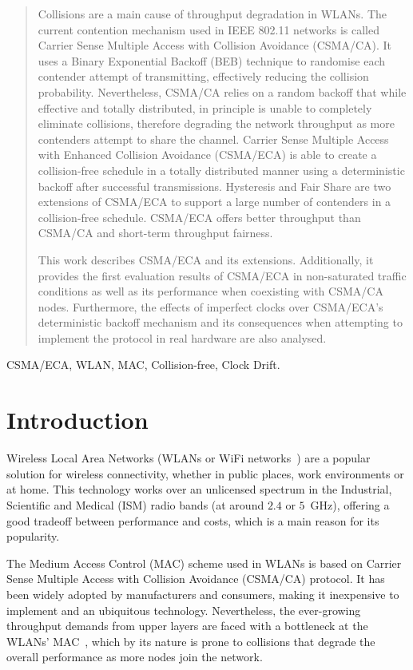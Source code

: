 \documentclass[a4paper,journal]{IEEEtran}
\begin{document}
\begin{abstract}

\boldmath Collisions are a main cause of throughput degradation in WLANs. The current contention mechanism used in IEEE 802.11 networks is called Carrier Sense Multiple Access with Collision Avoidance (CSMA/CA). It uses a Binary Exponential Backoff (BEB) technique to randomise each contender attempt of transmitting, effectively reducing the collision probability. Nevertheless, CSMA/CA relies on a random backoff that while effective and totally distributed, in principle is unable to completely eliminate collisions, therefore degrading the network throughput as more contenders attempt to share the channel. Carrier Sense Multiple Access with Enhanced Collision Avoidance (CSMA/ECA) is able to create a collision-free schedule in a totally distributed manner using a deterministic backoff after successful transmissions. Hysteresis and Fair Share are two extensions of CSMA/ECA to support a large number of contenders in a collision-free schedule. CSMA/ECA offers better throughput than CSMA/CA and short-term throughput fairness.


This work describes CSMA/ECA and its extensions. Additionally, it provides the first evaluation results of CSMA/ECA in non-saturated traffic conditions as well as its performance when coexisting with CSMA/CA nodes. Furthermore, the effects of imperfect clocks over CSMA/ECA's deterministic backoff mechanism and its consequences when attempting to implement the protocol in real hardware are also analysed.

\end{abstract}

\begin{IEEEkeywords}
CSMA/ECA, WLAN, MAC, Collision-free, Clock Drift.
\end{IEEEkeywords}

\section{Introduction}\label{introduction}
Wireless Local Area Networks (WLANs or WiFi networks~\cite{802Standards}) are a popular solution for wireless connectivity, whether in public places, work environments or at home. This technology works over an unlicensed spectrum in the Industrial, Scientific and Medical (ISM) radio bands (at around $2.4$ or $5$~GHz), offering a good tradeoff between performance and costs, which is a main reason for its popularity. 

The Medium Access Control (MAC) scheme used in WLANs is based on Carrier Sense Multiple Access with Collision Avoidance (CSMA/CA) protocol. It has been widely adopted by manufacturers and consumers, making it inexpensive to implement and an ubiquitous technology. Nevertheless, the ever-growing throughput demands from upper layers are faced with a bottleneck at the WLANs' MAC~\cite{perahia2008ieee}, which by its nature is prone to collisions that degrade the overall performance as more nodes join the network.
\end{document}
